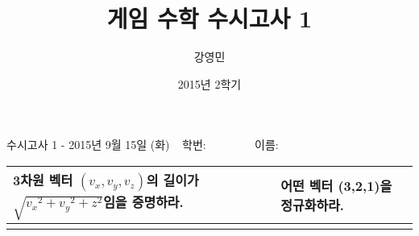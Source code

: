 \documentclass{beamer}
\title[게임수학 - 수시고사1]{ 게임 수학 수시고사 1}
\author{강영민}
\institute{동명대학교}
\date{2015년 2학기}
\begin{document}




\begin{frame}{\small 수시고사 1 - 2015년 9월 15일 (화) $~~$ 학번:$~~~~~~~~~~~~~~~~~~$                이름:  }

\begin{tabular}{|p{5.5cm}|p{5.5cm}|} \hline
\tiny 3차원 벡터 $(v_x,v_y,v_z)$의 길이가 $\sqrt{{v_x}^2 + {v_y}^2 + z^2 }$임을 증명하라. 
&
\tiny 어떤 벡터 (3,2,1)을 정규화하라.\\ \hline \hline

&
 \\ [35ex] \hline 
\end{tabular}

\end{frame}


\end{document}
